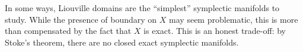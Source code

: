 
In some ways, Liouville domains are the ``simplest'' symplectic manifolds to study. While the presence of boundary on $X$ may seem problematic, this is more than compensated by the fact that $X$ is exact. This is an honest trade-off: by Stoke's theorem, there are no closed exact symplectic manifolds.
